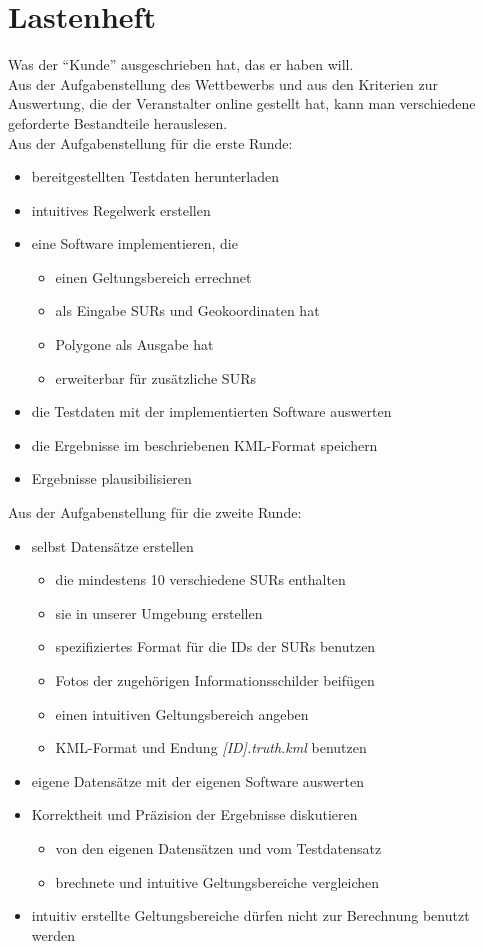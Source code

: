 \section{Lastenheft}
Was der ``Kunde'' ausgeschrieben hat, das er haben will.\\
Aus der Aufgabenstellung des Wettbewerbs und aus den Kriterien zur Auswertung, die der Veranstalter online gestellt hat, kann man
verschiedene geforderte Bestandteile herauslesen.\\
Aus der Aufgabenstellung für die erste Runde:
\begin{itemize}
 \item bereitgestellten Testdaten herunterladen
 \item intuitives Regelwerk erstellen
 \item eine Software implementieren, die 
 \begin{itemize}
 \item einen Geltungsbereich errechnet
 \item als Eingabe SURs und Geokoordinaten hat
 \item Polygone als Ausgabe hat
 \item erweiterbar für zusätzliche SURs
 \end{itemize}
 \item die Testdaten mit der implementierten Software auswerten
 \item die Ergebnisse im beschriebenen KML-Format speichern
 \item Ergebnisse plausibilisieren
\end{itemize}
Aus der Aufgabenstellung für die zweite Runde:
\begin{itemize}
 \item selbst Datensätze erstellen
 \begin{itemize}
 \item die mindestens 10 verschiedene SURs enthalten
 \item sie in unserer Umgebung erstellen
 \item spezifiziertes Format für die IDs der SURs benutzen
 \item Fotos der zugehörigen Informationsschilder beifügen
 \item einen intuitiven Geltungsbereich angeben
 \item KML-Format und Endung \textsl{[ID].truth.kml} benutzen
 \end{itemize}
 \item eigene Datensätze mit der eigenen Software auswerten
 \item Korrektheit und Präzision der Ergebnisse diskutieren
 \begin{itemize}
 \item von den eigenen Datensätzen und vom Testdatensatz
 \item brechnete und intuitive Geltungsbereiche vergleichen
 \end{itemize}
 \item intuitiv erstellte Geltungsbereiche dürfen nicht zur Berechnung benutzt werden
\end{itemize}
